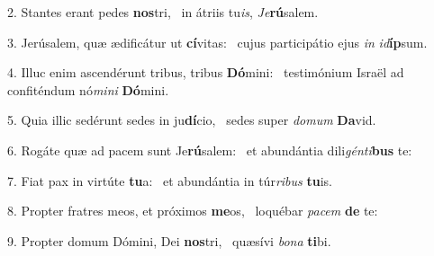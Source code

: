 2. Stantes erant pedes \textbf{nos}tri, \ast\  in átriis tu\textit{is}, \textit{Je}\textbf{rú}salem.\

3. Jerúsalem, quæ ædificátur ut \textbf{cí}vitas: \ast\  cujus participátio ejus \textit{in} \textit{id}\textbf{íp}sum.\

4. Illuc enim ascendérunt tribus, tribus \textbf{Dó}mini: \ast\  testimónium Israël ad confiténdum nó\textit{mi}\textit{ni} \textbf{Dó}mini.\

5. Quia illic sedérunt sedes in ju\textbf{dí}cio, \ast\  sedes super \textit{do}\textit{mum} \textbf{Da}vid.\

6. Rogáte quæ ad pacem sunt Je\textbf{rú}salem: \ast\  et abundántia dili\textit{gén}\textit{ti}\textbf{bus} te:\

7. Fiat pax in virtúte \textbf{tu}a: \ast\  et abundántia in túr\textit{ri}\textit{bus} \textbf{tu}is.\

8. Propter fratres meos, et próximos \textbf{me}os, \ast\  loquébar \textit{pa}\textit{cem} \textbf{de} te:\

9. Propter domum Dómini, Dei \textbf{nos}tri, \ast\  quæsívi \textit{bo}\textit{na} \textbf{ti}bi.\

